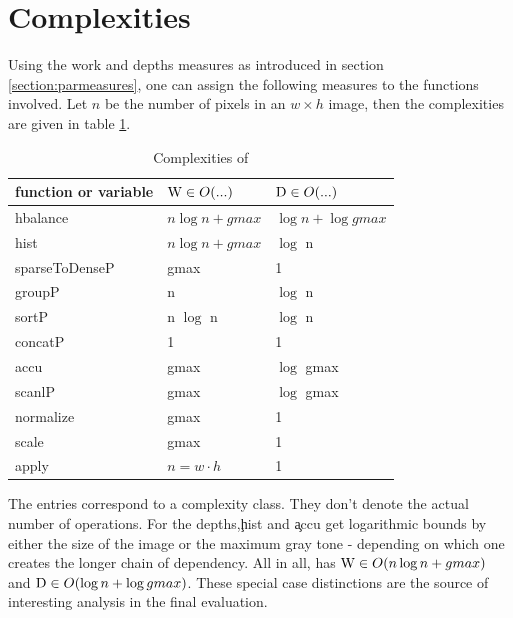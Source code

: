 \section{Complexities}
  Using the work and depths measures as introduced in section \ref{section:parmeasures},
  one can assign the following measures to the functions involved.
  Let $n$ be the number of pixels in an $w \times h$ image,
  then the complexities are given in table \ref{complexities:ndpn}.
  \begin{table}[h!]
    \caption{Complexities of \ndpn}
    \label{complexities:ndpn}
    \begin{center}
    \begin{tabular}{lll}
        \toprule
        function or variable & $\textrm{W} \in O(...)$           & $\textrm{D} \in O(...)$ \\
        \midrule
        hbalance        & $n \log n + gmax$   & $\log n + \log gmax$\\
        \midrule
        hist            & $n \log n + gmax$    & $\log$ n \\
        sparseToDenseP  & gmax                 & 1 \\
        groupP          & n                    & $\log$ n \\
        sortP           & n $\log$ n             & $\log$ n \\
        concatP         & 1                    & 1 \\
        \midrule
        accu            & gmax                 & $\log$ gmax \\
        scanlP          & gmax                 & $\log$ gmax \\
        \midrule
        normalize       & gmax                 & 1 \\
        scale           & gmax                 & 1 \\
        \midrule
        apply           & $n = w \cdot h$ & 1 \\
    \end{tabular}
    \end{center}
  \end{table}
    The entries correspond to a complexity class.
    They don't denote the actual number of operations.
    For the depths,\c{hist} and \c{accu} get logarithmic bounds by
    either the size of the image or the maximum gray tone
    - depending on which one creates the longer chain of dependency.
    All in all, \ndpn has $\textrm{W} \in O(n \log n + gmax)$
    and $\textrm{D} \in O(\log n + \log gmax)$.
    These special case distinctions are the source
    of interesting analysis in the final evaluation.
    
